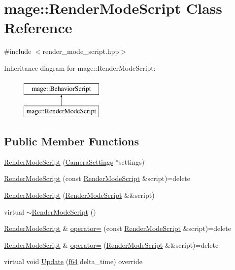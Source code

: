 \hypertarget{classmage_1_1_render_mode_script}{}\section{mage\+:\+:Render\+Mode\+Script Class Reference}
\label{classmage_1_1_render_mode_script}


{\ttfamily \#include $<$render\+\_\+mode\+\_\+script.\+hpp$>$}

Inheritance diagram for mage\+:\+:Render\+Mode\+Script\+:\begin{figure}[H]
\begin{center}
\leavevmode
\includegraphics[height=2.000000cm]{classmage_1_1_render_mode_script}
\end{center}
\end{figure}
\subsection*{Public Member Functions}
\begin{DoxyCompactItemize}
\item 
\hyperlink{classmage_1_1_render_mode_script_a313a1819a7d769199fe19a0573761e31}{Render\+Mode\+Script} (\hyperlink{structmage_1_1_camera_settings}{Camera\+Settings} $\ast$settings)
\item 
\hyperlink{classmage_1_1_render_mode_script_ac6b9d813ff57646b4bdcded5f1efdfb1}{Render\+Mode\+Script} (const \hyperlink{classmage_1_1_render_mode_script}{Render\+Mode\+Script} \&script)=delete
\item 
\hyperlink{classmage_1_1_render_mode_script_aafc57a9e0066734f91db798577ee3edb}{Render\+Mode\+Script} (\hyperlink{classmage_1_1_render_mode_script}{Render\+Mode\+Script} \&\&script)
\item 
virtual \hyperlink{classmage_1_1_render_mode_script_a9fac374686ee177e8272b4b7ea8f83a3}{$\sim$\+Render\+Mode\+Script} ()
\item 
\hyperlink{classmage_1_1_render_mode_script}{Render\+Mode\+Script} \& \hyperlink{classmage_1_1_render_mode_script_a0b81f5f341f48954e18b1a81c36a0263}{operator=} (const \hyperlink{classmage_1_1_render_mode_script}{Render\+Mode\+Script} \&script)=delete
\item 
\hyperlink{classmage_1_1_render_mode_script}{Render\+Mode\+Script} \& \hyperlink{classmage_1_1_render_mode_script_a8ca48ab27bef55314b1a822b827153b2}{operator=} (\hyperlink{classmage_1_1_render_mode_script}{Render\+Mode\+Script} \&\&script)=delete
\item 
virtual void \hyperlink{classmage_1_1_render_mode_script_a20a1b6ce8df88d7fc0d604cc75c435ac}{Update} (\hyperlink{namespacemage_ab935747c6941320bd6214b5a5f265b09}{f64} delta\+\_\+time) override
\end{DoxyCompactItemize}
